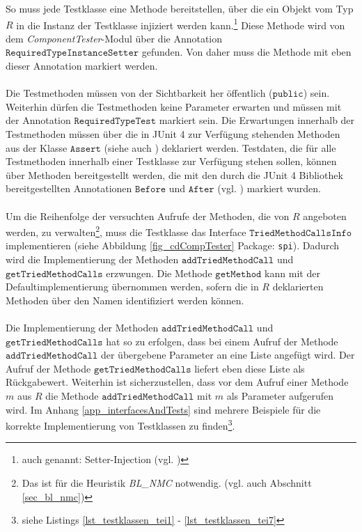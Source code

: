 \noindent
So muss jede Testklasse eine Methode bereitstellen, über die ein Objekt vom Typ $R$ in die Instanz der Testklasse injiziert werden kann.\footnote{auch genannt: Setter-Injection (vgl. \cite{setterinjection})} Diese Methode wird von dem \emph{ComponentTester}-\Gls{Modul} über die Annotation $\texttt{RequiredTypeInstanceSetter}$ gefunden. Von daher muss die Methode mit eben dieser Annotation markiert werden.
\\\\
Die Testmethoden müssen von der Sichtbarkeit her öffentlich ($\texttt{public}$) sein. Weiterhin dürfen die Testmethoden keine Parameter erwarten und müssen mit der Annotation $\texttt{RequiredTypeTest}$ markiert sein. Die Erwartungen innerhalb der Testmethoden müssen über die in JUnit 4 zur Verfügung stehenden Methoden aus der Klasse $\texttt{Assert}$ (siehe auch \cite{junit_api}) deklariert werden. Testdaten, die für alle Testmethoden innerhalb einer Testklasse zur Verfügung stehen sollen, können über Methoden bereitgestellt werden, die mit den durch die JUnit 4 Bibliothek bereitgestellten Annotationen $\texttt{Before}$ und $\texttt{After}$ (vgl. \cite{junit_api}) markiert wurden.
\\\\
Um die Reihenfolge der versuchten Aufrufe der Methoden, die von $R$ angeboten werden, zu verwalten\footnote{Das ist für die \Gls{Heuristik} \emph{BL\_NMC} notwendig. (vgl. auch Abschnitt \ref{sec_bl_nmc})}, muss die Testklasse das \Gls{Interface} $\texttt{TriedMethodCallsInfo}$ implementieren (siehe Abbildung \ref{fig_cdCompTester} Package: \texttt{spi}). Dadurch wird die Implementierung der Methoden $\texttt{addTriedMethodCall}$ und $\texttt{getTriedMethodCalls}$ erzwungen. Die Methode $\texttt{getMethod}$ kann mit der Defaultimplementierung übernommen werden, sofern die in $R$ deklarierten Methoden über den Namen identifiziert werden können.
\\\\
Die Implementierung der Methoden $\texttt{addTriedMethodCall}$ und $\texttt{getTriedMethodCalls}$ hat so zu erfolgen, dass bei einem Aufruf der Methode $\texttt{addTriedMethodCall}$ der übergebene Parameter an eine Liste angefügt wird. Der Aufruf der Methode $\texttt{getTriedMethodCalls}$ liefert eben diese Liste als Rückgabewert. Weiterhin ist sicherzustellen, dass vor dem Aufruf einer Methode $m$ aus $R$ die Methode $\texttt{addTriedMethodCall}$ mit $m$ als Parameter aufgerufen wird. Im Anhang \ref{app_interfacesAndTests} sind mehrere Beispiele für die korrekte Implementierung von Testklassen zu finden\footnote{siehe Listings \ref{lst_testklassen_tei1} - \ref{lst_testklassen_tei7}}.
